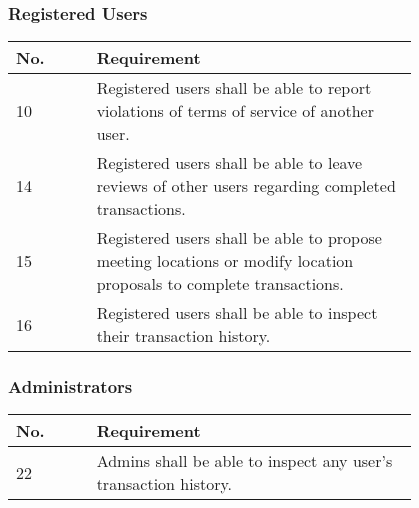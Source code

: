 \subsubsection{Registered Users}
\begin{tabular}{ | l | p{0.8\linewidth} | }
\hline
No. & Requirement\\\hline
10 & Registered users shall be able to report violations of terms of service of another user.\\\hline
14 & Registered users shall be able to leave reviews of other users regarding completed transactions.\\\hline
15 & Registered users shall be able to propose meeting locations or modify location proposals to complete transactions.\\\hline
16 & Registered users shall be able to inspect their transaction history.\\\hline
\end{tabular}
    
\subsubsection{Administrators}
\begin{tabular}{ | l | p{0.8\linewidth} | }
\hline
No. & Requirement\\\hline
22 & Admins shall be able to inspect any user's transaction history.\\\hline
\end{tabular}
